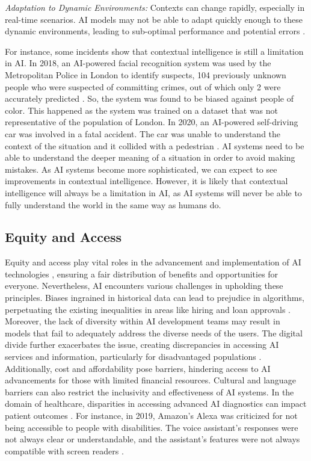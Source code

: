 \documentclass{article}
\begin{document}
\emph{Adaptation to Dynamic Environments:} Contexts can change rapidly, especially in real-time scenarios. AI models may not be able to adapt quickly enough to these dynamic environments, leading to sub-optimal performance and potential errors \cite{davies2023adapting}.

For instance, some incidents show that contextual intelligence is still a limitation in AI. In 2018, an AI-powered facial recognition system was used by the Metropolitan Police in London to identify suspects, 104 previously unknown people who were suspected of committing crimes, out of which only 2 were accurately predicted \cite{santow2020can}. So, the system was found to be biased against people of color. This happened as the system was trained on a dataset that was not representative of the population of London. In 2020, an AI-powered self-driving car was involved in a fatal accident. The car was unable to understand the context of the situation and it collided with a pedestrian \cite{macrae2022learning}.
AI systems need to be able to understand the deeper meaning of a situation in order to avoid making mistakes. As AI systems become more sophisticated, we can expect to see improvements in contextual intelligence. However, it is likely that contextual intelligence will always be a limitation in AI, as AI systems will never be able to fully understand the world in the same way as humans do.

\subsection{Equity and Access}
Equity and access play vital roles in the advancement and implementation of AI technologies \cite{kappel2022pursuing}, ensuring a fair distribution of benefits and opportunities for everyone. Nevertheless, AI encounters various challenges in upholding these principles. Biases ingrained in historical data can lead to prejudice in algorithms, perpetuating the existing inequalities in areas like hiring and loan approvals \cite{weinberg2022rethinking}. Moreover, the lack of diversity within AI development teams may result in models that fail to adequately address the diverse needs of the users. The digital divide further exacerbates the issue, creating discrepancies in accessing AI services and information, particularly for disadvantaged populations \cite{solanki2023operationalising}. Additionally, cost and affordability pose barriers, hindering access to AI advancements for those with limited financial resources. Cultural and language barriers can also restrict the inclusivity and effectiveness of AI systems. In the domain of healthcare, disparities in accessing advanced AI diagnostics can impact patient outcomes \cite{alami2020artificial, horgan2020artificial, mehta2020transforming}. For instance, in 2019, Amazon's Alexa was criticized for not being accessible to people with disabilities. The voice assistant's responses were not always clear or understandable, and the assistant's features were not always compatible with screen readers \cite{nunez2023use}.
\end{document}
